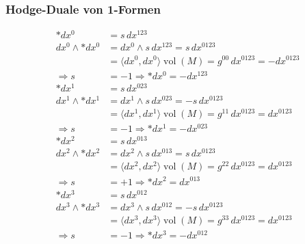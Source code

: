 \subsubsection{Hodge-Duale von 1-Formen}
\begin{align*}
	\ast dx^0 
	&= s \, dx^{123} \\
	dx^0 \wedge \ast dx^0 
	&= dx^0 \wedge s \, dx^{123} = s \, dx^{0123} \\
	&= \langle dx^0, dx^0 \rangle \operatorname{vol}(M) = g^{00} \, dx^{0123} = -dx^{0123} \\
	\Rightarrow s &= -1 \Rightarrow \boxed{\ast dx^0 = - dx^{123}}
	\\[1em]
	\ast dx^1 
	&= s \, dx^{023} \\
	dx^1 \wedge \ast dx^1 
	&= dx^1 \wedge s \, dx^{023} = -s \, dx^{0123} \\
	&= \langle dx^1, dx^1 \rangle \operatorname{vol}(M) = g^{11} \, dx^{0123} = dx^{0123} \\
	\Rightarrow s &= -1 \Rightarrow \boxed{\ast dx^1 = - dx^{023}}
	\\[1em]
	\ast dx^2 
	&= s \, dx^{013} \\
	dx^2 \wedge \ast dx^2 
	&= dx^2 \wedge s \, dx^{013} = s \, dx^{0123} \\
	&= \langle dx^2, dx^2 \rangle \operatorname{vol}(M) = g^{22} \, dx^{0123} = dx^{0123} \\
	\Rightarrow s &= +1 \Rightarrow \boxed{\ast dx^2 = dx^{013}}
	\\[1em]
	\ast dx^3 
	&= s \, dx^{012} \\
	dx^3 \wedge \ast dx^3 
	&= dx^3 \wedge s \, dx^{012} = -s \, dx^{0123} \\
	&= \langle dx^3, dx^3 \rangle \operatorname{vol}(M) = g^{33} \, dx^{0123} = dx^{0123} \\
	\Rightarrow s &= -1 \Rightarrow \boxed{\ast dx^3 = - dx^{012}}
\end{align*}


